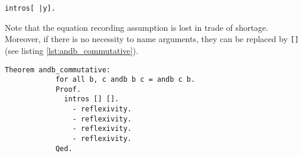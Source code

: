 		  \begin{lstlisting}[caption= shortform \lstinline!intros! and  \lstinline!destruct!, label= lst:shortformIntrosAndDestruct]
		  intros[ |y].
		  \end{lstlisting}		  
		  Note that the equation recording assumption is lost in trade of shortage.
		  Moreover, if there is no necessity to name arguments, they can be replaced by \lstinline![]! (see listing \ref{lst:andb_commutative}).
		  \begin{lstlisting}[caption= \lstinline!andb_commutative!, label =lst:andb_commutative]
		  Theorem andb_commutative:
		    for all b, c andb b c = andb c b.
		    Proof.
		      intros [] [].
		        - reflexivity.
		        - reflexivity.
		        - reflexivity.
		        - reflexivity.
		    Qed. 		  		  
		  \end{lstlisting}
		     
	    
   
   
   

